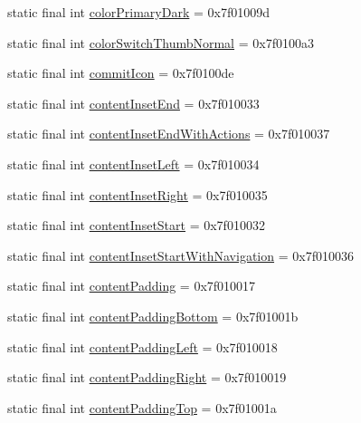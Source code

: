 \begin{CompactItemize}
\item 
static final int \hyperlink{classandroid_1_1support_1_1mediacompat_1_1_r_1_1attr_f469ec435c94457bf783e4c3e438bc0d}{colorPrimaryDark} = 0x7f01009d
\item 
static final int \hyperlink{classandroid_1_1support_1_1mediacompat_1_1_r_1_1attr_dc6997fb454c78fc8bd3daf5b08f38d9}{colorSwitchThumbNormal} = 0x7f0100a3
\item 
static final int \hyperlink{classandroid_1_1support_1_1mediacompat_1_1_r_1_1attr_d47113de0c74574ba2efb461013cd056}{commitIcon} = 0x7f0100de
\item 
static final int \hyperlink{classandroid_1_1support_1_1mediacompat_1_1_r_1_1attr_dcf9ead489d0e05d75c232c8caa74966}{contentInsetEnd} = 0x7f010033
\item 
static final int \hyperlink{classandroid_1_1support_1_1mediacompat_1_1_r_1_1attr_af3125f798dd5232bf8387a0a3e19dce}{contentInsetEndWithActions} = 0x7f010037
\item 
static final int \hyperlink{classandroid_1_1support_1_1mediacompat_1_1_r_1_1attr_bd612bc21f3c5215061a63de58546da3}{contentInsetLeft} = 0x7f010034
\item 
static final int \hyperlink{classandroid_1_1support_1_1mediacompat_1_1_r_1_1attr_49d694e00d85ec9dde403911ea1bad7b}{contentInsetRight} = 0x7f010035
\item 
static final int \hyperlink{classandroid_1_1support_1_1mediacompat_1_1_r_1_1attr_14132900f47d0619ec8c616445eafbe5}{contentInsetStart} = 0x7f010032
\item 
static final int \hyperlink{classandroid_1_1support_1_1mediacompat_1_1_r_1_1attr_f90f6d870ff11f252e9b8785fd76eb15}{contentInsetStartWithNavigation} = 0x7f010036
\item 
static final int \hyperlink{classandroid_1_1support_1_1mediacompat_1_1_r_1_1attr_2d646ce988f652fb69a1d3bcee659af9}{contentPadding} = 0x7f010017
\item 
static final int \hyperlink{classandroid_1_1support_1_1mediacompat_1_1_r_1_1attr_8b14956aeec803a678bcfa6de1a43e03}{contentPaddingBottom} = 0x7f01001b
\item 
static final int \hyperlink{classandroid_1_1support_1_1mediacompat_1_1_r_1_1attr_f3065debe96e3f9cc1920e21d65e8523}{contentPaddingLeft} = 0x7f010018
\item 
static final int \hyperlink{classandroid_1_1support_1_1mediacompat_1_1_r_1_1attr_77693c18d004d91ae351bbac5f3ad69d}{contentPaddingRight} = 0x7f010019
\item 
static final int \hyperlink{classandroid_1_1support_1_1mediacompat_1_1_r_1_1attr_37fe8f086de77d5db7a6b2ec5ffe2660}{contentPaddingTop} = 0x7f01001a

\end{CompactItemize}
